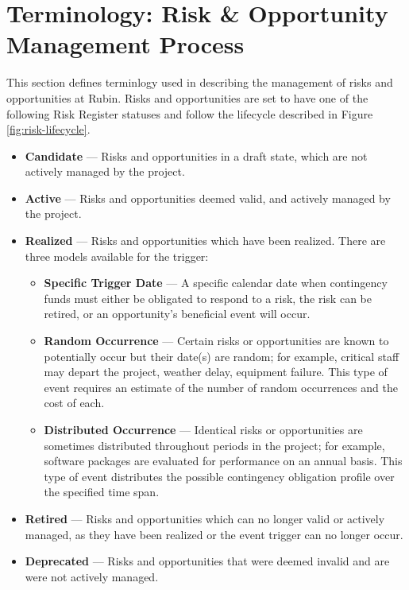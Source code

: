 \section{Terminology: Risk \& Opportunity Management Process}
\label{sec:process}

This section defines terminlogy used in describing the management of risks and opportunities at Rubin.
Risks and opportunities are set to have one of the following Risk Register statuses and follow the lifecycle described in Figure \ref{fig:risk-lifecycle}.

\begin{itemize}
	\item \textbf{Candidate} ---
	Risks and opportunities in a draft state, which are not actively managed by the project.

	\item \textbf{Active} ---
	Risks and opportunities deemed valid, and actively managed by the project.

	\item \textbf{Realized} ---
	Risks and opportunities which have been realized.
	There are three models available for the trigger:
		\begin{itemize}
			\item \textbf{Specific Trigger Date} ---
			A specific calendar date when contingency funds must either be obligated to respond to a risk, the risk can be retired, or an opportunity's beneficial event will occur.

			\item \textbf{Random Occurrence} ---
			Certain risks or opportunities are known to potentially occur but their date(s) are random; for example, critical staff may depart the project, weather delay, equipment failure.
			This type of event requires an estimate of the number of random occurrences and the cost of each.

			\item \textbf{Distributed Occurrence} ---
			Identical risks or opportunities are sometimes distributed throughout periods in the project; for example, software packages are evaluated for performance on an annual basis.
			This type of event distributes the possible contingency obligation profile over the specified time span.
		\end{itemize}

	\item \textbf{Retired} ---
	Risks and opportunities which can no longer valid or actively managed, as they have been realized or the event trigger can no longer occur.

	\item \textbf{Deprecated} ---
	Risks and opportunities that were deemed invalid and are were not actively managed.
\end{itemize}

